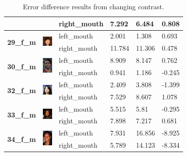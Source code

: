 \documentclass{l4proj}
\begin{document}
\begin{table}[h!]
\begin{tabular}{|l|l|l|l|l|l|}
 &  & right\_mouth & 7.292 & 6.484 & 0.808 \\ \hline
\multirow{2}{*}{\textbf{29\_f\_m}} & \multirow{2}{*}{\includegraphics[width=5mm]{images/29_f_m.jpg}} & left\_mouth & 2.001 & 1.308 & 0.693 \\ \cline{3-6} 
 &  & right\_mouth & 11.784 & 11.306 & 0.478 \\ \hline
\multirow{2}{*}{\textbf{30\_f\_m}} & \multirow{2}{*}{\includegraphics[width=5mm]{images/30_f_m.jpg}} & left\_mouth & 8.909 & 8.147 & 0.762 \\ \cline{3-6} 
 &  & right\_mouth & 0.941 & 1.186 & -0.245 \\ \hline
\multirow{2}{*}{\textbf{32\_f\_m}} & \multirow{2}{*}{\includegraphics[width=5mm]{images/32_f_m.jpg}} & left\_mouth & 2.409 & 3.808 & -1.399 \\ \cline{3-6} 
 &  & right\_mouth & 7.529 & 8.607 & 1.078 \\ \hline
\multirow{2}{*}{\textbf{33\_f\_m}} & \multirow{2}{*}{\includegraphics[width=5mm]{images/33_f_m.jpg}} & left\_mouth & 5.515 & 5.81 & -0.295 \\ \cline{3-6} 
 &  & right\_mouth & 7.898 & 7.217 & 0.681 \\ \hline
\multirow{2}{*}{\textbf{34\_f\_m}} & \multirow{2}{*}{\includegraphics[width=5mm]{images/34_f_m.jpg}} & left\_mouth & 7.931 & 16.856 & -8.925 \\ \cline{3-6} 
 &  & right\_mouth & 5.789 & 14.123 & -8.334 \\ \hline
\end{tabular}
\vspace*{3mm}
\caption{Error difference results from changing contrast.}
\label{results_changed}
\end{table}

\end{document}
